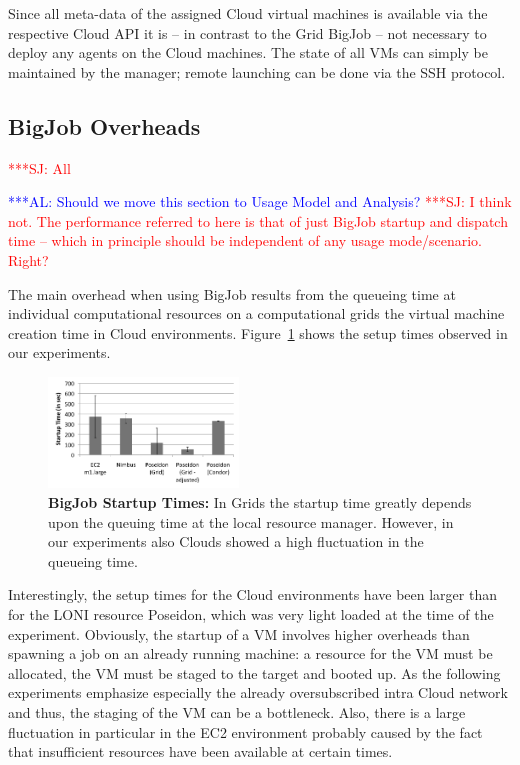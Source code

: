 \documentclass[conference,final]{IEEEtran}
\newcommand{\alnote}[1]{ {\textcolor{blue} { ***AL: #1 }}}
\newcommand{\jhanote}[1]{ {\textcolor{red} { ***SJ: #1 }}}
\newcommand{\alnote}[1]{}
\newcommand{\jhanote}[1]{}
\begin{document}
Since all meta-data of the assigned Cloud virtual machines is available via 
the respective Cloud API it is -- in contrast to the Grid BigJob -- not necessary 
to deploy any agents on the Cloud machines. The state of all VMs can simply be 
maintained by the manager; remote launching can be done via the SSH protocol.


\subsection{BigJob Overheads} \jhanote{All}

\alnote{Should we move this section to Usage Model and Analysis?}
\jhanote{I think not. The performance referred to here is that of just
  BigJob startup and dispatch time -- which in principle should be
  independent of any usage mode/scenario. Right?}

The main overhead when using BigJob results from the queueing time at
individual computational resources on a computational grids the
virtual machine creation time in Cloud
environments. Figure~\ref{fig:performance_setup_time} shows the setup
times observed in our experiments.
\begin{figure}[htbp]
    \centering
        \includegraphics[width=0.45\textwidth]{performance/setup_time_xls.pdf}
    \caption{\textbf{BigJob Startup Times:} In Grids the startup time
      greatly depends upon the queuing time at the local resource
      manager. However, in our experiments also Clouds showed a high
      fluctuation in the queueing time.}
    \label{fig:performance_setup_time}
\end{figure}

Interestingly, the setup times for the Cloud environments have been larger than 
for the LONI resource Poseidon, which was very light loaded at the time
of the experiment. Obviously, the startup of a VM involves higher overheads 
than spawning a job on an already running machine: a resource for the VM 
must be allocated, the VM must be staged to the target and booted up. As the following
experiments emphasize especially the already oversubscribed intra Cloud network
and thus, the staging of the VM can be a bottleneck. Also, there is a
large fluctuation in particular in the EC2 environment probably caused by 
the fact that insufficient resources have been available at certain times.
\end{document}
